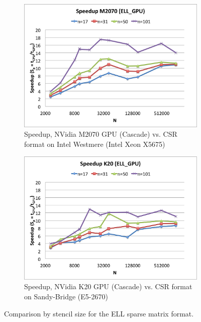 \documentclass{report}
\begin{document}
\begin{figure}
\begin{subfigure}[t]{0.48\textwidth}
\includegraphics[width=\textwidth]{gpu_content/cascade_spmv/ell_comparison_speedup_cascade_m2070.png}
\caption{Speedup, NVidia M2070 GPU (Cascade) vs. CSR format on Intel Westmere (Intel Xeon X5675)}
\label{fig:ell_speedup_cascade_m2070}
\end{subfigure}
\quad
\begin{subfigure}[t]{0.48\textwidth}
\centering
\includegraphics[width=\textwidth]{gpu_content/cascade_spmv/ell_comparison_speedup_cascade_k20.png}
\caption{Speedup, NVidia K20 GPU (Cascade) vs. CSR format on Sandy-Bridge (E5-2670)}
\label{fig:ell_speedup_cascade_k20}
\end{subfigure}
\caption{Comparison by stencil size for the ELL sparse matrix format.}
\end{figure}
\end{document}

